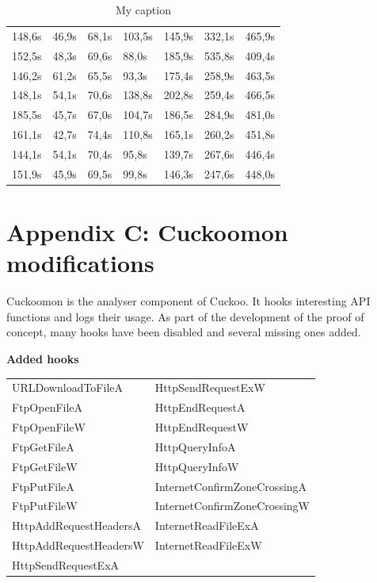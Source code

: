 \documentclass{scrartcl}
\begin{document}
\begin{table}[h]
\begin{tabular}{@{}lllllll@{}}
148,6s    & 46,9s      & 68,1s      & 103,5s      & 145,9s      & 332,1s      & 465,9s       \\
152,5s    & 48,3s      & 69,6s      & 88,0s       & 185,9s      & 535,8s      & 409,4s       \\
146,2s    & 61,2s      & 65,5s      & 93,3s       & 175,4s      & 258,9s      & 463,5s       \\
148,1s    & 54,1s      & 70,6s      & 138,8s      & 202,8s      & 259,4s      & 466,5s       \\
185,5s    & 45,7s      & 67,0s      & 104,7s      & 186,5s      & 284,9s      & 481,0s       \\
161,1s    & 42,7s      & 74,4s      & 110,8s      & 165,1s      & 260,2s      & 451,8s       \\
144,1s    & 54,1s      & 70,4s      & 95,8s       & 139,7s      & 267,6s      & 446,4s       \\
151,9s    & 45,9s      & 69,5s      & 99,8s       & 146,3s      & 247,6s      & 448,0s       \\ \bottomrule
\end{tabular}
\caption{My caption}
\label{my-label}
\end{table}

\clearpage

\section*{Appendix C: Cuckoomon modifications}

Cuckoomon is the analyser component of Cuckoo. It hooks interesting API functions and logs their usage. As part of the development of the proof of concept, many hooks have been disabled and several missing ones added.

\textbf{Added hooks}

\begin{longtable}{*{2}{>{\arraybackslash}p{6cm}}}
URLDownloadToFileA     & HttpSendRequestExW           \\
FtpOpenFileA           & HttpEndRequestA              \\
FtpOpenFileW           & HttpEndRequestW              \\
FtpGetFileA            & HttpQueryInfoA               \\
FtpGetFileW            & HttpQueryInfoW               \\
FtpPutFileA            & InternetConfirmZoneCrossingA \\
FtpPutFileW            & InternetConfirmZoneCrossingW \\
HttpAddRequestHeadersA & InternetReadFileExA          \\
HttpAddRequestHeadersW & InternetReadFileExW          \\
HttpSendRequestExA     &                             
\end{longtable}
\end{document}
